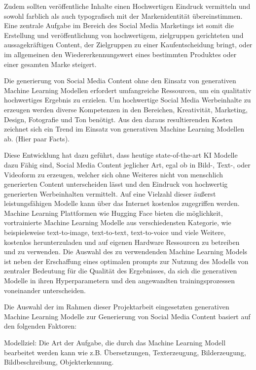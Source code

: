 Zudem sollten veröffentliche Inhalte einen Hochwertigen Eindruck vermitteln und sowohl farblich als auch typografisch mit der Markenidentität übereinstimmen.
Eine zentrale Aufgabe im Bereich des Social Media Marketings ist somit die Erstellung und veröffentlichung von hochwertigem, zielgruppen gerichteten und aussagekräftigen Content, der Zielgruppen zu einer Kaufentscheidung bringt, oder im allgemeinen den Wiedererkennungswert eines bestimmten Produktes oder einer gesamten Marke  steigert.

Die generierung von Social Media Content ohne den Einsatz von generativen Machine Learning Modellen erfordert umfangreiche Ressourcen, um ein qualitativ hochwertiges Ergebnis zu erzielen.
Um hochwertige Social Media Werbeinhalte zu erzeugen werden diverse Kompetenzen in den Bereichen, Kreativität, Marketing, Design, Fotografie und Ton benötigt.
Aus den daraus resultierenden Kosten zeichnet sich ein Trend im Einsatz von generativen Machine Learning Modellen ab. (Hier paar Facts).

Diese Entwicklung hat dazu geführt, dass heutige state-of-the-art KI Modelle dazu Fähig sind, Social Media Content jeglicher Art, egal ob in Bild-, Text-, oder Videoform zu erzeugen, welcher sich ohne Weiteres nicht von menschlich generierten Content unterscheiden lässt und den Eindruck von hochwertig generierten Werbeinhalten vermittelt.
Auf eine Vielzahl dieser äußerst leistungsfähigen Modelle kann über das Internet kostenlos zugegriffen werden.
Machine Learning Plattformen wie Hugging Face bieten die möglichkeit, vortrainierte Machine Learning Modelle aus verschiedensten Kategorie, wie beispielsweise text-to-image, text-to-text, text-to-voice und viele Weitere, kostenlos herunterzuladen und auf eigenen Hardware Ressourcen zu betreiben und zu verwenden.
Die Auswahl des zu verwendenden Machine Learning Models ist neben der Erschaffung eines optimalen prompts zur Nutzung des Modells von zentraler Bedeutung für die Qualität des Ergebnisses, da sich die generativen Modelle in ihren Hyperparametern und den angewandten trainingsprozessen voneinander unterscheiden.

Die Auswahl der im Rahmen dieser Projektarbeit eingesetzten generativen Machine Learning Modelle zur Generierung von Social Media Content basiert auf den folgenden Faktoren:

Modellziel: Die Art der Aufgabe, die durch das Machine Learning Modell bearbeitet werden kann wie z.B. Übersetzungen, Texterzeugung, Bilderzeugung, Bildbeschreibung, Objekterkennung.

